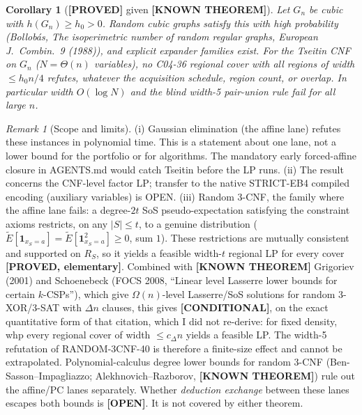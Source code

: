 \documentclass[11pt]{article}
\newtheorem{corollary}[theorem]{Corollary}
\theoremstyle{remark}
\newtheorem{remark}[theorem]{Remark}
\newcommand{\lab}[1]{\textbf{[#1]}}
\begin{document}
\begin{corollary}[\lab{PROVED} given \lab{KNOWN THEOREM}]
Let $G_n$ be cubic with $h(G_n)\ge h_0>0$. Random cubic graphs satisfy this with high probability
(Bollob\'as, \emph{The isoperimetric number of random regular graphs}, European J.\ Combin.\ 9
(1988)), and explicit expander families exist. For the Tseitin CNF on $G_n$ ($N=\Theta(n)$ variables),
\emph{no} C04-36 regional cover with all regions of width $\le h_0 n/4$ refutes, whatever the
acquisition schedule, region count, or overlap. In particular width $O(\log N)$ and the blind
width-5 pair-union rule fail for all large $n$.
\end{corollary}

\begin{remark}[Scope and limits]
(i) Gaussian elimination (the affine lane) refutes these instances in polynomial time. This is a
statement about one lane, not a lower bound for the portfolio or for algorithms. The
mandatory early forced-affine closure in AGENTS.md would catch Tseitin before the LP runs.
(ii) The result concerns the CNF-level factor LP; transfer to the native STRICT-EB4 compiled
encoding (auxiliary variables) is OPEN.
(iii) Random 3-CNF, the family where the affine lane fails: a degree-$2t$ SoS pseudo-expectation
satisfying the constraint axioms restricts, on any $|S|\le t$, to a genuine distribution
($\tilde E[\mathbf 1_{x_S=a}]=\tilde E[\mathbf 1_{x_S=a}^2]\ge 0$, sum $1$). These restrictions are
mutually consistent and supported on $R_S$, so it yields a feasible width-$t$ regional LP for
every cover \lab{PROVED, elementary}. Combined with \lab{KNOWN THEOREM} Grigoriev (2001) and
Schoenebeck (FOCS 2008, ``Linear level Lasserre lower bounds for certain $k$-CSPs''), which give
$\Omega(n)$-level Lasserre/SoS solutions for random 3-XOR/3-SAT with $\Delta n$ clauses, this gives
\lab{CONDITIONAL}, on the exact quantitative form of that citation, which I did not re-derive: for fixed density, whp every regional cover of width
$\le c_\Delta n$ yields a feasible LP. The width-5 refutation of RANDOM-3CNF-40 is therefore a
finite-size effect and cannot be extrapolated. Polynomial-calculus degree lower bounds for random
3-CNF (Ben-Sasson--Impagliazzo; Alekhnovich--Razborov, \lab{KNOWN THEOREM}) rule out the affine/PC lanes separately.
Whether \emph{deduction exchange} between these lanes escapes both bounds is \lab{OPEN}. It is not covered
by either theorem.
\end{remark}
\end{document}
